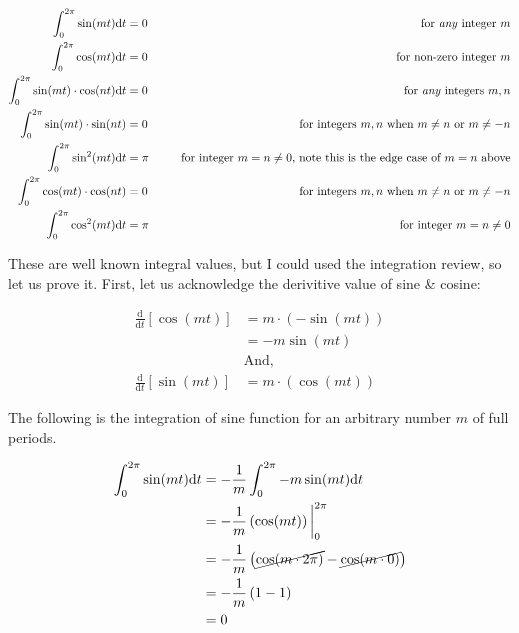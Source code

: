 \documentclass[10pt]{article} %
\begin{document}
\begin{align}
    \int_0^{2\pi} \sin(mt)\mathrm{d}t &= 0 &\text{\hspace{0.5cm} for \textit{any} integer $m$}\\
    \int_0^{2\pi} \cos(mt)\mathrm{d}t &= 0 &\text{\hspace{0.5cm} for non-zero integer $m$}\\
    \int_0^{2\pi} \sin(mt) \cdot \cos(nt)\mathrm{d}t &= 0 &\text{\hspace{0.5cm} for \textit{any} integers $m, n$}\\
    \int_0^{2\pi} \sin(mt) \cdot \sin(nt) &= 0 &\text{\hspace{0.5cm} for integers $m,n$ when $m \neq n$ or $m \neq -n$}\\
    \int_0^{2\pi} \sin^2(mt)\mathrm{d}t &= \pi &\text{\hspace{0.5cm} for integer $m = n \neq 0$, note this is the edge case of $m=n$ above} \\
    \int_0^{2\pi} \cos(mt) \cdot \cos(nt) &= 0 &\text{\hspace{0.5cm} for integers $m,n$ when $m \neq n$ or $m \neq -n$}\\
    \int_0^{2\pi} \cos^2(mt)\mathrm{d}t &= \pi &\text{\hspace{0.5cm} for integer $m = n \neq 0$}
\end{align}

These are well known integral values, but I could used the integration review, so let us prove it. First, let us acknowledge the derivitive value of sine \& cosine:

\begin{align*}
    \frac{\mathrm{d}}{\mathrm{d}t}[\cos(mt)] & = m\cdot\left(-\sin(mt)\right) \\
    & = -m\sin(mt)\\
    &\text{And,}\\
    \frac{\mathrm{d}}{\mathrm{d}t}[\sin(mt)] & = m\cdot\left(\cos(mt)\right)
\end{align*}

The following is the integration of sine function for an arbitrary number $m$ of full periods.

\begin{align}
    \int_0^{2\pi} \sin(mt)\mathrm{d}t & = -\frac1m\int_0^{2\pi}-m\sin(mt)\mathrm{d}t \\
    & = -\frac1m\left(\cos(mt)\right)\bigg\rvert_0^{2\pi} \\
    & = -\frac1m\left(\cancel{\cos(m\cdot2\pi)} - \cancel{\cos(m\cdot 0)}\right) \\
    & = -\frac1m\left(1 - 1\right) \\
    & = 0
\end{align}
\end{document}
